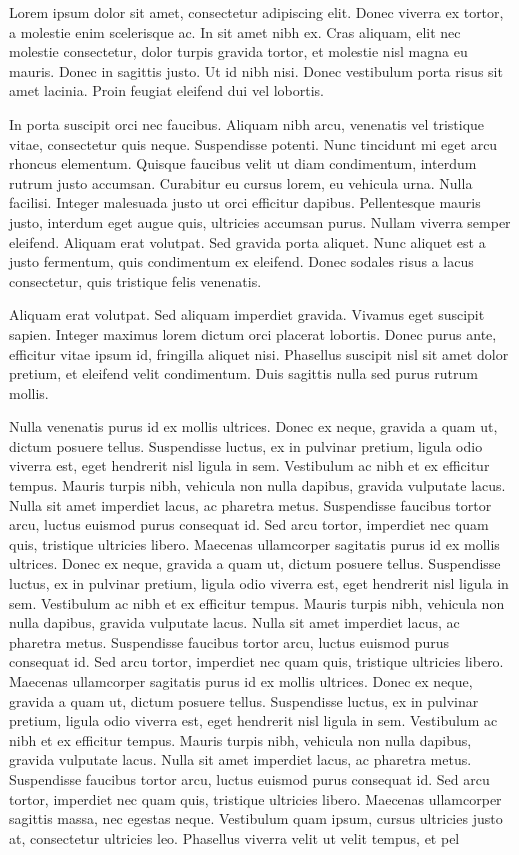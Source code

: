 Lorem ipsum dolor sit amet, consectetur adipiscing elit. Donec viverra ex tortor, a molestie enim scelerisque ac. In sit amet nibh ex. Cras aliquam, elit nec molestie consectetur, dolor turpis gravida tortor, et molestie nisl magna eu mauris. Donec in sagittis justo. Ut id nibh nisi. Donec vestibulum porta risus sit amet lacinia. Proin feugiat eleifend dui vel lobortis.

In porta suscipit orci nec faucibus. Aliquam nibh arcu, venenatis vel tristique vitae, consectetur quis neque. Suspendisse potenti. Nunc tincidunt mi eget arcu rhoncus elementum. Quisque faucibus velit ut diam condimentum, interdum rutrum justo accumsan. Curabitur eu cursus lorem, eu vehicula urna. Nulla facilisi. Integer malesuada justo ut orci efficitur dapibus. Pellentesque mauris justo, interdum eget augue quis, ultricies accumsan purus. Nullam viverra semper eleifend. Aliquam erat volutpat. Sed gravida porta aliquet. Nunc aliquet est a justo fermentum, quis condimentum ex eleifend. Donec sodales risus a lacus consectetur, quis tristique felis venenatis.

Aliquam erat volutpat. Sed aliquam imperdiet gravida. Vivamus eget suscipit sapien. Integer maximus lorem dictum orci placerat lobortis. Donec purus ante, efficitur vitae ipsum id, fringilla aliquet nisi. Phasellus suscipit nisl sit amet dolor pretium, et eleifend velit condimentum. Duis sagittis nulla sed purus rutrum mollis.

Nulla venenatis purus id ex mollis ultrices. Donec ex neque, gravida a quam ut, dictum posuere tellus. Suspendisse luctus, ex in pulvinar pretium, ligula odio viverra est, eget hendrerit nisl ligula in sem. Vestibulum ac nibh et ex efficitur tempus. Mauris turpis nibh, vehicula non nulla dapibus, gravida vulputate lacus. Nulla sit amet imperdiet lacus, ac pharetra metus. Suspendisse faucibus tortor arcu, luctus euismod purus consequat id. Sed arcu tortor, imperdiet nec quam quis, tristique ultricies libero. Maecenas ullamcorper sagitatis purus id ex mollis ultrices. Donec ex neque, gravida a quam ut, dictum posuere tellus. Suspendisse luctus, ex in pulvinar pretium, ligula odio viverra est, eget hendrerit nisl ligula in sem. Vestibulum ac nibh et ex efficitur tempus. Mauris turpis nibh, vehicula non nulla dapibus, gravida vulputate lacus. Nulla sit amet imperdiet lacus, ac pharetra metus. Suspendisse faucibus tortor arcu, luctus euismod purus consequat id. Sed arcu tortor, imperdiet nec quam quis, tristique ultricies libero. Maecenas ullamcorper sagitatis purus id ex mollis ultrices. Donec ex neque, gravida a quam ut, dictum posuere tellus. Suspendisse luctus, ex in pulvinar pretium, ligula odio viverra est, eget hendrerit nisl ligula in sem. Vestibulum ac nibh et ex efficitur tempus. Mauris turpis nibh, vehicula non nulla dapibus, gravida vulputate lacus. Nulla sit amet imperdiet lacus, ac pharetra metus. Suspendisse faucibus tortor arcu, luctus euismod purus consequat id. Sed arcu tortor, imperdiet nec quam quis, tristique ultricies libero. Maecenas ullamcorper sagittis massa, nec egestas neque. Vestibulum quam ipsum, cursus ultricies justo at, consectetur ultricies leo. Phasellus viverra velit ut velit tempus, et pel

